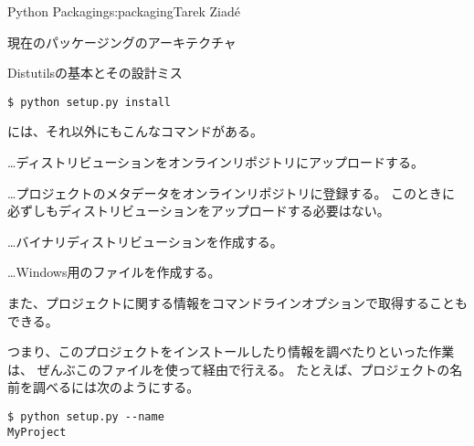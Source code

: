 \begin{aosachapter}{Python Packaging}{s:packaging}{Tarek Ziad\'{e}}
\begin{aosasect1}{現在のパッケージングのアーキテクチャ}
\begin{aosasect2}{Distutilsの基本とその設計ミス}
\begin{verbatim}
$ python setup.py install
\end{verbatim}

には、それ以外にもこんなコマンドがある。

\begin{aosaitemize}

  \item {}…ディストリビューションをオンラインリポジトリにアップロードする。

  \item {}…プロジェクトのメタデータをオンラインリポジトリに登録する。
  このときに必ずしもディストリビューションをアップロードする必要はない。

  \item {}…バイナリディストリビューションを作成する。

  \item {}…Windows用のファイルを作成する。

\end{aosaitemize}

\noindent
また、プロジェクトに関する情報をコマンドラインオプションで取得することもできる。

つまり、このプロジェクトをインストールしたり情報を調べたりといった作業は、
ぜんぶこのファイルを使って経由で行える。
たとえば、プロジェクトの名前を調べるには次のようにする。

\begin{verbatim}
$ python setup.py --name
MyProject
\end{verbatim}


\end{aosasect2}
\end{aosasect1}
\end{aosachapter}
